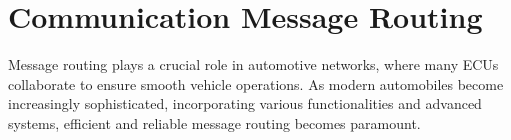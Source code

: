 
    \section{Communication Message Routing}
    Message routing plays a crucial role in automotive networks, where many ECUs collaborate to ensure smooth vehicle operations. As modern automobiles become increasingly sophisticated, incorporating various functionalities and advanced systems, efficient and reliable message routing becomes paramount.
    

